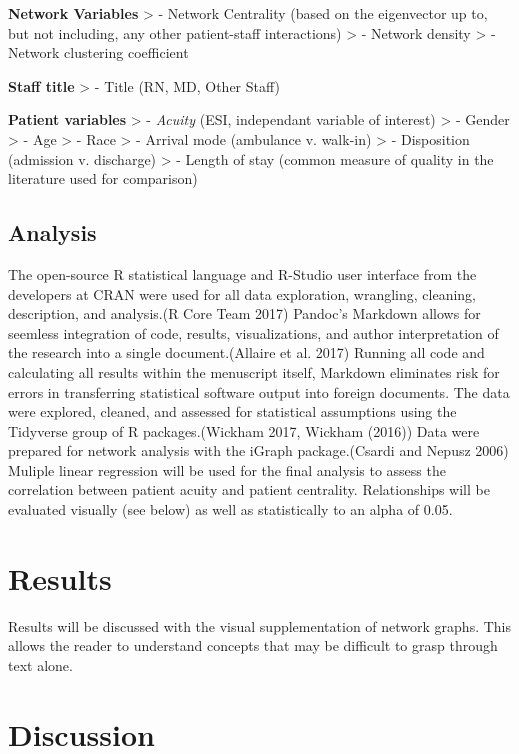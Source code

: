 \documentclass[]{elsarticle} %
\begin{document}
\textbf{Network Variables} \textgreater{} - Network Centrality (based on
the eigenvector up to, but not including, any other patient-staff
interactions) \textgreater{} - Network density \textgreater{} - Network
clustering coefficient

\textbf{Staff title} \textgreater{} - Title (RN, MD, Other Staff)

\textbf{Patient variables} \textgreater{} - \emph{Acuity} (ESI,
independant variable of interest) \textgreater{} - Gender \textgreater{}
- Age \textgreater{} - Race \textgreater{} - Arrival mode (ambulance v.
walk-in) \textgreater{} - Disposition (admission v. discharge)
\textgreater{} - Length of stay (common measure of quality in the
literature used for comparison)

\subsection{Analysis}\label{analysis}

The open-source R statistical language and R-Studio user interface from
the developers at CRAN were used for all data exploration, wrangling,
cleaning, description, and analysis.(R Core Team 2017) Pandoc's Markdown
allows for seemless integration of code, results, visualizations, and
author interpretation of the research into a single document.(Allaire et
al. 2017) Running all code and calculating all results within the
menuscript itself, Markdown eliminates risk for errors in transferring
statistical software output into foreign documents. The data were
explored, cleaned, and assessed for statistical assumptions using the
Tidyverse group of R packages.(Wickham 2017, Wickham (2016)) Data were
prepared for network analysis with the iGraph package.(Csardi and Nepusz
2006) Muliple linear regression will be used for the final analysis to
assess the correlation between patient acuity and patient centrality.
Relationships will be evaluated visually (see below) as well as
statistically to an alpha of 0.05.

\section{Results}\label{results}

Results will be discussed with the visual supplementation of network
graphs. This allows the reader to understand concepts that may be
difficult to grasp through text alone.

\section{Discussion}\label{discussion}
\end{document}

